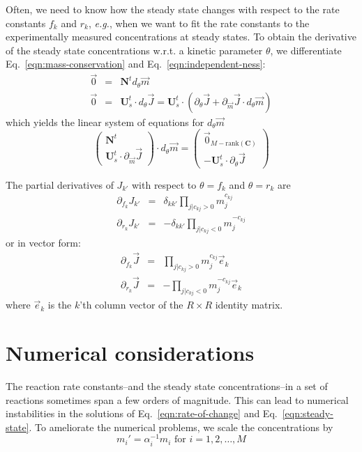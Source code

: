 \documentclass[aps,groupedaddress]{revtex4}
\newcommand*{\mat}[1]{\mathbf{#1}}
\newcommand*{\rank}[1]{\mathrm{rank}({#1})}
\begin{document}
Often, we need to know how the steady state changes with respect to
the rate constants $f_k$ and $r_k$, {\it e.g.}, when we want to fit
the rate constants to the experimentally measured concentrations at
steady states.  To obtain the derivative of the steady state
concentrations w.r.t. a kinetic parameter $\theta$, we differentiate
Eq.~\ref{eqn:mass-conservation} and Eq.~\ref{eqn:independent-ness}:
\begin{eqnarray}
\vec{0} &=& \mat{N}^t d_\theta \vec{m} 
\nonumber \\
\vec{0} &=& \mat{U}_s^t \cdot d_\theta \vec{J} = \mat{U}_s^t \cdot \left(
  \partial_\theta \vec{J} + \partial_{\vec{m}}{\vec{J}} \cdot d_\theta \vec{m} \right) 
\end{eqnarray}
which yields the linear system of equations for $d_\theta \vec{m}$
\begin{equation}
\left( \begin{array}{c}
\mat{N}^t \\
\mat{U}_s^t\cdot \partial_{\vec{m}} \vec{J}
\end{array} \right)\cdot d_\theta\vec{m} = 
\left( \begin{array}{c}
\vec{0}_{M-\rank{\mat{C}}} \\
-\mat{U}_s^t\cdot \partial_\theta \vec{J}
\end{array} \right)
\label{eqn:ness-param-derivative}
\end{equation}

The partial derivatives of $J_{k'}$ with respect to $\theta = f_{k}$
and $\theta = r_{k}$ are
\begin{eqnarray}
\partial_{f_{k}} J_{k'} &=& \delta_{kk'} \prod_{j|c_{kj}>0} m_j^{c_{kj}}
\nonumber \\
\partial_{r_{k}} J_{k'} &=& -\delta_{kk'} \prod_{j|c_{kj}<0} m_j^{-c_{kj}}
\end{eqnarray}
or in vector form:
\begin{eqnarray}
\partial_{f_{k}} \vec{J} &=& \prod_{j|c_{kj}>0} m_j^{c_{kj}} \vec{e}_k
\nonumber \\
\partial_{r_{k}} \vec{J} &=& -\prod_{j|c_{kj}<0} m_j^{-c_{kj}} \vec{e}_k
\end{eqnarray}
where $\vec{e}_k$ is the $k$'th column vector of the $R\times R$
identity matrix.

\section{Numerical considerations}

The reaction rate constants--and the steady state concentrations--in a
set of reactions sometimes span a few orders of magnitude.  This can
lead to numerical instabilities in the solutions of
Eq.~\ref{eqn:rate-of-change} and Eq.~\ref{eqn:steady-state}.  To ameliorate 
the numerical problems, we scale the concentrations by
%
\begin{equation}
m_i' = \alpha_i^{-1} m_i \text{ for }i=1,2,\dots,M
\end{equation}
\end{document}
